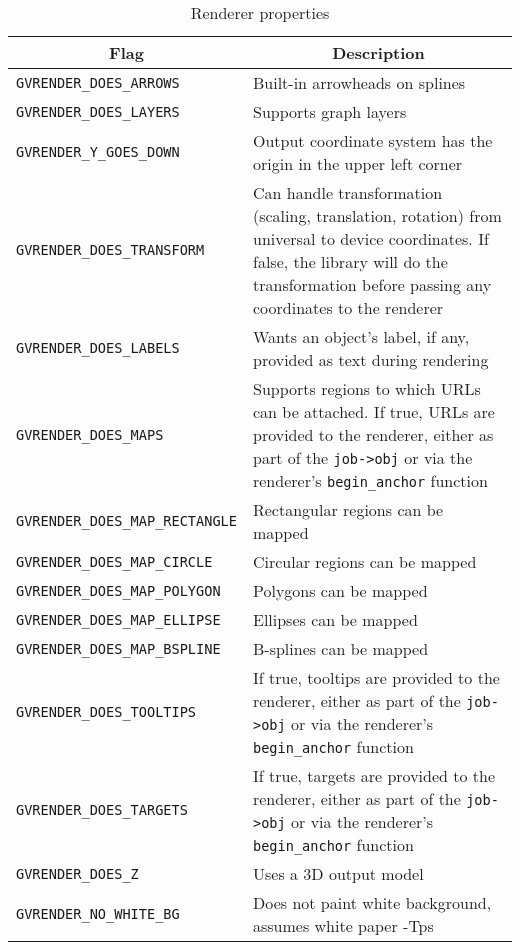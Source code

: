 \begin{table*}[htbp]\footnotesize
\centering
\begin{tabular}[t]{|l|p{3.5in}|} \hline
\multicolumn{1}{|c|}{Flag} & \multicolumn{1}{c|}{Description} \\ \hline
{\tt GVRENDER\_DOES\_ARROWS} & Built-in arrowheads on splines \\
{\tt GVRENDER\_DOES\_LAYERS} & Supports graph layers \\
{\tt GVRENDER\_Y\_GOES\_DOWN} & Output coordinate system has the origin in
the upper left corner \\
{\tt GVRENDER\_DOES\_TRANSFORM} & Can handle transformation (scaling,
translation, rotation) from universal
to device coordinates. If false, the library will do the transformation
before passing any coordinates to the renderer \\
{\tt GVRENDER\_DOES\_LABELS} & Wants an object's label, if any, provided 
as text during rendering \\
{\tt GVRENDER\_DOES\_MAPS} & Supports regions to which URLs can be attached.
If true, URLs are provided to the renderer, 
either as part of the {\tt job->obj} or via the renderer's {\tt begin\_anchor}
function \\
{\tt GVRENDER\_DOES\_MAP\_RECTANGLE} & Rectangular regions can be mapped \\
{\tt GVRENDER\_DOES\_MAP\_CIRCLE} & Circular regions can be mapped \\
{\tt GVRENDER\_DOES\_MAP\_POLYGON} & Polygons can be mapped \\
{\tt GVRENDER\_DOES\_MAP\_ELLIPSE} & Ellipses can be mapped \\
{\tt GVRENDER\_DOES\_MAP\_BSPLINE} & B-splines can be mapped \\
{\tt GVRENDER\_DOES\_TOOLTIPS} & If true, tooltips are provided to the renderer,
either as part of the {\tt job->obj} or via the renderer's {\tt begin\_anchor}
function \\
{\tt GVRENDER\_DOES\_TARGETS} & If true, targets are provided to the renderer, 
either as part of the {\tt job->obj} or via the renderer's {\tt begin\_anchor}
function \\
{\tt GVRENDER\_DOES\_Z} & Uses a 3D output model \\
{\tt GVRENDER\_NO\_WHITE\_BG} & Does not paint white background, assumes white
paper -Tps \\
\hline
\end{tabular}
\caption{Renderer properties}
\label{table:renderflags}
\end{table*}

